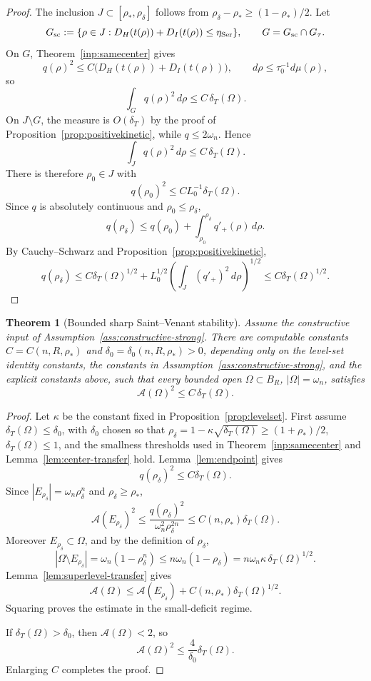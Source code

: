 \documentclass[11pt]{amsart}
\newtheorem{theorem}{Theorem}[section]
\theoremstyle{definition}
\newcommand{\Om}{\Omega}
\newcommand{\Fr}{\mathcal A}
\newcommand{\dT}{\delta_T}
\newcommand{\rstar}{\rho_*}
\newcommand{\rdel}{\rho_\delta}
\begin{document}
\begin{proof}
The inclusion \(J\subset[\rstar,\rdel]\) follows from
\(\rdel-\rstar\ge(1-\rstar)/2\).  Let
\[
   G_{\rm sc}:=\{\rho\in J:
      D_H(t(\rho))+D_I(t(\rho))\le\eta_{\rm Ser}\},
   \qquad G=G_{\rm sc}\cap G_\tau .
\]
On \(G\), Theorem~\ref{inp:samecenter} gives
\[
   q(\rho)^2\le C\bigl(D_H(t(\rho))+D_I(t(\rho))\bigr),
   \qquad d\rho\le\tau_0^{-1}d\mu(\rho),
\]
so
\[
   \int_G q(\rho)^2\,d\rho\le C\,\dT(\Om).
\]
On \(J\setminus G\), the measure is \(O(\dT)\) by the proof of
Proposition~\ref{prop:positivekinetic}, while \(q\le2\omega_n\).  Hence
\[
   \int_J q(\rho)^2\,d\rho\le C\,\dT(\Om).
\]
There is therefore \(\rho_0\in J\) with
\[
   q(\rho_0)^2\le C L_0^{-1}\dT(\Om).
\]
Since \(q\) is absolutely continuous and \(\rho_0\le\rdel\),
\[
   q(\rdel)
   \le q(\rho_0)+\int_{\rho_0}^{\rdel}q'_+(\rho)\,d\rho.
\]
By Cauchy--Schwarz and Proposition~\ref{prop:positivekinetic},
\[
   q(\rdel)
   \le C\dT(\Om)^{1/2}
      +L_0^{1/2}\left(\int_J(q'_+)^2\,d\rho\right)^{1/2}
   \le C\dT(\Om)^{1/2}.
\]
\end{proof}

\begin{theorem}[Bounded sharp Saint--Venant stability]
\label{thm:boundedSV}
Assume the constructive input of Assumption~\ref{ass:constructive-strong}.
There are computable constants \(C=C(n,R,\rstar)\) and
\(\delta_0=\delta_0(n,R,\rstar)>0\), depending only on the level-set
identity constants, the constants in Assumption~\ref{ass:constructive-strong},
and the explicit constants above, such that every bounded open \(\Om\subset B_R\),
\(|\Om|=\omega_n\), satisfies
\[
   \Fr(\Om)^2\le C\,\dT(\Om).
\]
\end{theorem}

\begin{proof}
Let \(\kappa\) be the constant fixed in Proposition~\ref{prop:levelset}.
First assume \(\dT(\Om)\le\delta_0\), with \(\delta_0\) chosen so that
\(\rdel=1-\kappa\sqrt{\dT(\Om)}\ge(1+\rstar)/2\), \(\dT(\Om)\le1\), and
the smallness thresholds used in Theorem~\ref{inp:samecenter} and
Lemma~\ref{lem:center-transfer} hold.
Lemma~\ref{lem:endpoint} gives
\[
   q(\rdel)^2\le C\dT(\Om).
\]
Since \(|E_{\rdel}|=\omega_n\rdel^n\) and \(\rdel\ge\rstar\),
\[
   \Fr(E_{\rdel})^2
   \le \frac{q(\rdel)^2}{\omega_n^2\rdel^{2n}}
   \le C(n,\rstar)\dT(\Om).
\]
Moreover \(E_{\rdel}\subset\Om\), and by the definition of \(\rdel\),
\[
   |\Om\setminus E_{\rdel}|
   =\omega_n(1-\rdel^n)
   \le n\omega_n(1-\rdel)
   =n\omega_n\kappa\,\dT(\Om)^{1/2}.
\]
Lemma~\ref{lem:superlevel-transfer} gives
\[
   \Fr(\Om)
   \le \Fr(E_{\rdel})+C(n,\rstar)\dT(\Om)^{1/2}.
\]
Squaring proves the estimate in the small-deficit regime.

If \(\dT(\Om)>\delta_0\), then \(\Fr(\Om)<2\), so
\[
   \Fr(\Om)^2\le \frac{4}{\delta_0}\dT(\Om).
\]
Enlarging \(C\) completes the proof.
\end{proof}
\end{document}
